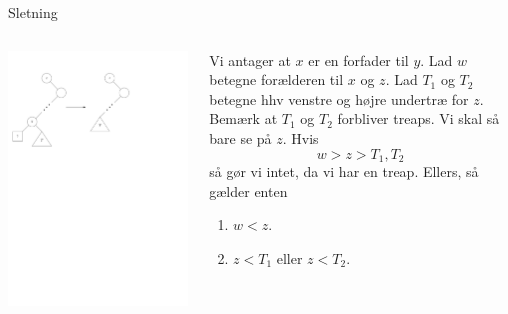 \documentclass{beamer} %
\begin{document}
\begin{frame}
\pause
Sletning
\begin{columns}
\begin{column}{0.5\textwidth}
	\begin{center}
		\includegraphics[scale=0.4]{../images/tree_remove_xy}
	\end{center}
\end{column}
\begin{column}{0.5\textwidth}
    \pause Vi antager at $x$ er en forfader til $y$. \pause Lad $w$ betegne forælderen til $x$ og $z$. \pause Lad $T_1$ og $T_2$ betegne hhv venstre og højre undertræ for $z$. \pause Bemærk at $T_1$ og $T_2$ forbliver treaps. \pause Vi skal så bare se på $z$. \pause Hvis
    \[
    	w > z > T_1, T_2
    \]
    så gør vi intet, da vi har en treap. \pause Ellers, så gælder enten
    \begin{enumerate}
    	\pause \item $w < z$.
    	\pause \item $z < T_1$ eller $z < T_2$.
    \end{enumerate}
\end{column}
\end{columns}
\end{frame}
\end{document}
